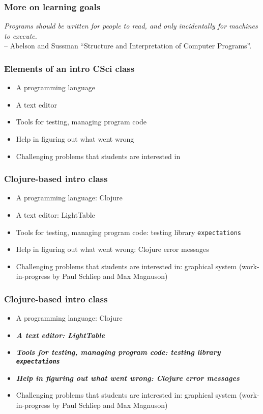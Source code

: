 \documentclass{beamer}
\newcommand{\comment}[1]{{\bf \tt  {#1}}}
\newcommand{\emcomment}[1]{\textcolor{ForestGreen}{\comment{Elena: {#1}}}}
\begin{document}
\begin{frame}[fragile]
\frametitle{More on learning goals}
{\it Programs should be written for people to read, and only incidentally for machines to execute.}
\\	 
-- Abelson and Sussman ``Structure and Interpretation of Computer Programs''.
\end{frame}

\begin{frame}[fragile]
\frametitle{Elements of an intro CSci class}
\begin{itemize}
\item A programming language
\item A text editor
\item Tools for testing, managing program code
\item Help in figuring out what went wrong
\item Challenging problems that students are interested in
\end{itemize}
\end{frame}

\begin{frame}[fragile]
\frametitle{Clojure-based intro class}
\begin{itemize}
\item A programming language: Clojure
\item A text editor: LightTable
\item Tools for testing, managing program code: testing library {\tt expectations}
\item Help in figuring out what went wrong: Clojure error messages 
\item Challenging problems that students are interested in: graphical system (work-in-progress by Paul Schliep and Max Magnuson)
\end{itemize}
\end{frame}

\begin{frame}[fragile]
\frametitle{Clojure-based intro class}
\begin{itemize}
\item A programming language: Clojure
\item {\em\bf A text editor: LightTable}
\item {\em\bf Tools for testing, managing program code: testing library {\tt expectations}}
\item {\em\bf Help in figuring out what went wrong: Clojure error messages}
\item Challenging problems that students are interested in: graphical system (work-in-progress by Paul Schliep and Max Magnuson)
\end{itemize}
\end{frame}
\end{document}
